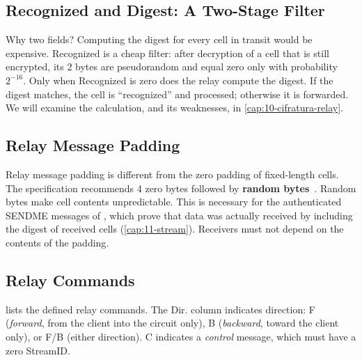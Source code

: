 \subsection{Recognized and Digest: A Two-Stage Filter}

Why two fields? Computing the digest for every cell in transit would be expensive. Recognized is a cheap filter: after decryption of a cell that is still encrypted, its 2 bytes are pseudorandom and equal zero only with probability $2^{-16}$. Only when Recognized is zero does the relay compute the digest. If the digest matches, the cell is \enquote{recognized} and processed; otherwise it is forwarded. We will examine the calculation, and its weaknesses, in \cref{cap:10-cifratura-relay}.

\subsection{Relay Message Padding}

Relay message padding is different from the zero padding of fixed-length cells. The specification recommends 4 zero bytes followed by \textbf{random bytes}~. Random bytes make cell contents unpredictable. This is necessary for the authenticated SENDME messages of , which prove that data was actually received by including the digest of received cells (\cref{cap:11-stream}). Receivers must not depend on the contents of the padding.

\subsection{Relay Commands}

 lists the defined relay commands. The Dir. column indicates direction: F (\emph{forward}, from the client into the circuit only), B (\emph{backward}, toward the client only), or F/B (either direction). C indicates a \emph{control} message, which must have a zero StreamID.

